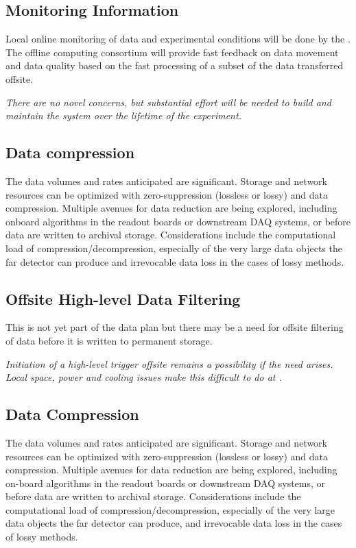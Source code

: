 \documentclass[../main-v1.tex]{subfiles}
\begin{document}
\subsection{Monitoring Information} 
Local online monitoring of data and experimental conditions will be done by the . %
The offline computing consortium will provide fast feedback on data movement and data quality based on the fast processing of a subset of the data transferred offsite. 

{\it There are no novel concerns, but substantial effort will be needed to build and maintain the system over the lifetime of the experiment.}
\subsection{Data compression}
The data volumes and rates anticipated are significant. Storage and network resources can be optimized with zero-suppression (lossless or lossy) and data compression. Multiple avenues for data reduction are being explored, including onboard algorithms in the readout boards or downstream DAQ systems, or before data are written to archival storage.  Considerations include the computational load of compression/decompression, especially of the very large data objects the far detector can produce and irrevocable data loss in the cases of lossy methods. 

\subsection{Offsite High-level Data Filtering}

This is not yet part of the data plan but there may be a need for offsite filtering of data before %
it is written to permanent storage. 

{\it  Initiation of a high-level trigger offsite remains a possibility if the need arises. Local space, power and cooling issues make this difficult to do at .}

\subsection{Data Compression}
The data volumes and rates anticipated are significant. Storage and network resources can be optimized with zero-suppression (lossless or lossy) and data compression. Multiple avenues for data reduction are being explored, including on-board algorithms in the readout boards or downstream DAQ systems, or before data are written to archival storage.  Considerations include the computational load of compression/decompression, especially of the very large data objects the far detector can produce, and irrevocable data loss in the cases of lossy methods.
\end{document}
